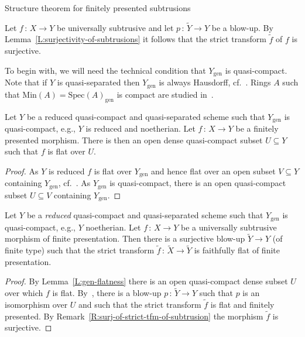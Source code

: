 \documentclass[a4paper,twoside,11pt]{amsart}[2009/07/02] %
\newcommand{\pref}[1]{\eqref{#1}}
\newcommand{\map}[3]{#1\,:\, #2\rightarrow #3}
\newcommand{\Spec}{\mathrm{Spec}}
\newcommand{\Min}{\mathrm{Min}}
\newcommand{\genpts}{\mathrm{gen}} %
\begin{document}
\begin{section}{Structure theorem for finitely presented subtrusions}
\begin{remark}\label{R:surj-of-strict-tfm-of-subtrusion}
Let $\map{f}{X}{Y}$ be universally subtrusive and let
$\map{p}{\widetilde{Y}}{Y}$ be a blow-up. By
Lemma~\pref{L:surjectivity-of-subtrusions} it follows that the strict
transform $\widetilde{f}$ of $f$ is surjective.
\end{remark}

To begin with, we will need the technical condition that $Y_\genpts$ is
quasi-compact. Note that if $Y$ is quasi-separated then $Y_\genpts$ is always
Hausdorff, cf.~\cite[Ch.~I, Lem.~2.8]{lazard_autour}. Rings $A$ such that
$\Min(A)=\Spec(A)_\genpts$ is compact are studied
in~\cite[Ch.~II]{olivier_sem_samuel}.


\begin{lemma}\label{L:gen-flatness}
Let $Y$ be a reduced quasi-compact and quasi-separated scheme such that
$Y_\genpts$ is quasi-compact, e.g., $Y$ is reduced and noetherian. Let
$\map{f}{X}{Y}$ be a finitely presented morphism. There is then an open dense
quasi-compact subset $U\subseteq Y$ such that $f$ is flat over $U$.
\end{lemma}
\begin{proof}
As $Y$ is reduced $f$ is flat over $Y_\genpts$ and hence flat over an open
subset $V\subseteq Y$ containing $Y_\genpts$, cf.~\cite[Cor.~11.3.2]{egaIV}.
As $Y_\genpts$ is quasi-compact, there is an open quasi-compact subset
$U\subseteq V$ containing $Y_\genpts$.
\end{proof}

\begin{proposition}\label{P:ST-qc}
Let $Y$ be a \emph{reduced} quasi-compact and quasi-separated scheme such that
$Y_\genpts$ is quasi-compact, e.g., $Y$ noetherian. Let $\map{f}{X}{Y}$ be a
universally subtrusive morphism of finite presentation. Then there is a
surjective blow-up $\widetilde{Y}\to Y$ (of finite type) such that the
strict transform $\map{\widetilde{f}}{\widetilde{X}}{\widetilde{Y}}$ is
faithfully flat of finite presentation.
\end{proposition}
\begin{proof}
By Lemma~\pref{L:gen-flatness} there is an open quasi-compact dense subset
$U$ over which $f$ is flat. By~\cite[Thm.~5.2.2]{raynaud-gruson}, there is a
blow-up $\map{p}{\widetilde{Y}}{Y}$ such that $p$ is an isomorphism over $U$
and such that the strict transform $\widetilde{f}$ is flat and finitely
presented. By Remark~\pref{R:surj-of-strict-tfm-of-subtrusion} the morphism
$\widetilde{f}$ is surjective.
\end{proof}


\end{section}
\end{document}
